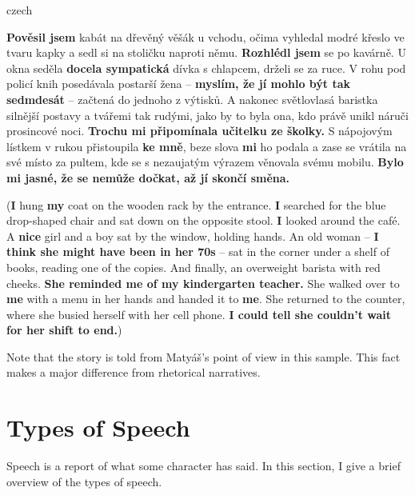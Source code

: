 \begin{otherlanguage*}{czech}
\begin{quoting}
\textbf{Pověsil jsem} kabát na dřevěný věšák u vchodu, očima vyhledal modré křeslo ve tvaru kapky a sedl si na stoličku naproti němu. \textbf{Rozhlédl jsem} se po kavárně. U okna seděla \textbf{docela sympatická} dívka s chlapcem, drželi se za ruce. V rohu pod policí knih posedávala postarší žena -- \textbf{myslím, že jí mohlo být tak sedmdesát} -- začtená do jednoho z výtisků. A nakonec světlovlasá baristka silnější postavy a tvářemi tak rudými, jako by to byla ona, kdo právě unikl náruči prosincové noci. \textbf{Trochu mi připomínala učitelku ze školky.} S nápojovým lístkem v rukou přistoupila \textbf{ke mně}, beze slova \textbf{mi} ho podala a zase se vrátila na své místo za pultem, kde se s nezaujatým výrazem věnovala svému mobilu. \textbf{Bylo mi jasné, že se nemůže dočkat, až jí skončí směna.} \newline
\end{quoting}
\end{otherlanguage*}
\begin{quoting}
(\textbf{I} hung \textbf{my} coat on the wooden rack by the entrance. \textbf{I} searched for the blue drop-shaped chair and sat down on the opposite stool. \textbf{I} looked around the café. A \textbf{nice} girl and a boy sat by the window, holding hands. An old woman -- \textbf{I think she might have been in her 70s} -- sat in the corner under a shelf of books, reading one of the copies. And finally, an overweight barista with red cheeks. \textbf{She reminded me of my kindergarten teacher.} She walked over to \textbf{me} with a menu in her hands and handed it to \textbf{me}. She returned to the counter, where she busied herself with her cell phone. \textbf{I could tell she couldn't wait for her shift to end.})
\newline
\end{quoting}


Note that the story is told from Matyáš's point of view in this sample. This fact makes a major difference from rhetorical narratives.

\section{Types of Speech} \label{sec:speeches}

Speech is a report of what some character has said. In this section, I give a brief overview of the types of speech.

